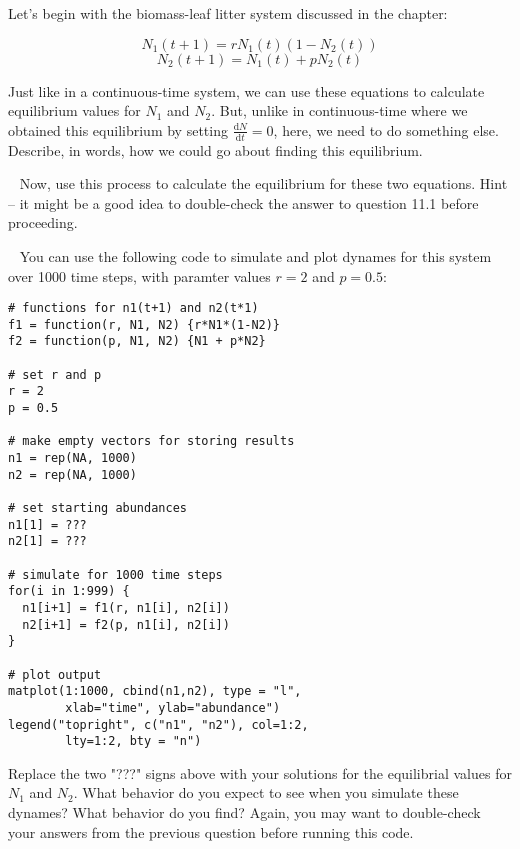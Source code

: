 \documentclass[12pt]{article}
\begin{document}
\date{}
\maketitle

\newline
Let's begin with the biomass-leaf litter system discussed in the chapter:

$$ N_1(t+1) = r N_1(t)(1-N_2(t)) $$
$$ N_2(t+1) = N_1(t) + p N_2(t) $$

Just like in a continuous-time system, we can use these equations to calculate equilibrium values for $N_1$ and $N_2$. But, unlike in continuous-time where we obtained this equilibrium by setting $\frac{\mathrm{d}N}{\mathrm{d}t} = 0$, here, we need to do something else. Describe, in words, how we could go about finding this equilibrium.

~\newline
{}
\newline
Now, use this process to calculate the equilibrium for these two equations. Hint -- it might be a good idea to double-check the answer to question 11.1 before proceeding.

~\newline
{}
\newline
You can use the following code to simulate and plot dynames for this system over 1000 time steps, with paramter values $r = 2$ and $p = 0.5$:

\begin{verbatim}
# functions for n1(t+1) and n2(t*1)
f1 = function(r, N1, N2) {r*N1*(1-N2)}
f2 = function(p, N1, N2) {N1 + p*N2}

# set r and p
r = 2
p = 0.5

# make empty vectors for storing results
n1 = rep(NA, 1000)
n2 = rep(NA, 1000)

# set starting abundances
n1[1] = ???
n2[1] = ???

# simulate for 1000 time steps
for(i in 1:999) {
  n1[i+1] = f1(r, n1[i], n2[i])
  n2[i+1] = f2(p, n1[i], n2[i])
}

# plot output
matplot(1:1000, cbind(n1,n2), type = "l",
        xlab="time", ylab="abundance")
legend("topright", c("n1", "n2"), col=1:2,
		lty=1:2, bty = "n")
\end{verbatim}

Replace the two "???" signs above with your solutions for the equilibrial values for $N_1$ and $N_2$. What behavior do you expect to see when you simulate these dynames? What behavior do you find? Again, you may want to double-check your answers from the previous question before running this code.
\end{document}

